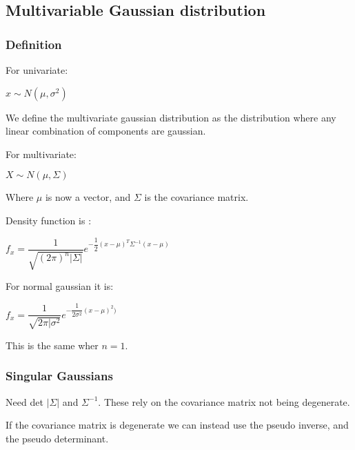 
\subsection{Multivariable Gaussian distribution}

\subsubsection{Definition}

For univariate:

\(x \sim N(\mu, \sigma^2 )\)

We define the multivariate gaussian distribution as the distribution where any linear combination of components are gaussian.

For multivariate:

\(X \sim N(\mu, \Sigma )\)

Where \(\mu \) is now a vector, and \(\Sigma \) is the covariance matrix.

Density function is :

\(f_x=\dfrac{1}{\sqrt {(2\pi )^n|\Sigma |}} e^{-\dfrac{1}{2}(x-\mu )^T\Sigma^{-1}(x-\mu)}\)

For normal gaussian it is:

\(f_x=\dfrac{1}{\sqrt {2\pi |\sigma^2}} e^{-\dfrac{1}{2\sigma^2}(x-\mu )^2)}\)

This is the same wher \(n=1\).

\subsubsection{Singular Gaussians}

Need det \(|\Sigma |\) and \(\Sigma^{-1}\). These rely on the covariance matrix not being degenerate.

If the covariance matrix is degenerate we can instead use the pseudo inverse, and the pseudo determinant.

